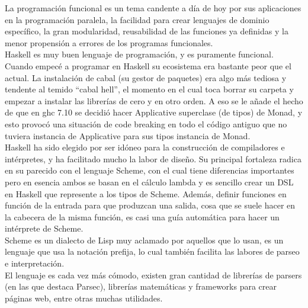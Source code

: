 

La programaci\'on funcional es un tema candente a d\'ia de hoy por sus aplicaciones en la programaci\'on paralela, la facilidad para crear lenguajes de dominio espec\'ifico, la gran modularidad, reusabilidad de las funciones ya definidas y la menor propensi\'on a errores de los programas funcionales.\\

Haskell es muy buen lenguaje de programaci\'on, y es puramente funcional. Cuando empec\'e a programar en Haskell su ecosistema era bastante peor que el actual. La instalaci\'on de cabal (su gestor de paquetes) era algo m\'as tediosa y tendente al temido ``cabal hell'', el momento en el cual toca borrar su carpeta y empezar a instalar las librer\'ias de cero y en otro orden. A eso se le a\~{n}ade el hecho de que en ghc 7.10 se decidi\'o hacer Applicative superclase (de tipos) de Monad, y esto provoc\'o una situaci\'on de code breaking en todo el c\'odigo antiguo que no tuviera instancia de Applicative para sus tipos instancia de Monad.\\

Haskell ha sido elegido por ser id\'oneo para la construcci\'on de compiladores e int\'erpretes, y ha facilitado mucho la labor de dise\~{n}o. Su principal fortaleza radica en su parecido con el lenguaje Scheme, con el cual tiene diferencias importantes pero en esencia ambos se basan en el c\'alculo lambda y es sencillo crear un DSL en Haskell que represente a los tipos de Scheme. Adem\'as, definir funciones en funci\'on de la entrada para que produzcan una salida, cosa que se suele hacer en la cabecera de la misma funci\'on, es casi una gu\'ia autom\'atica para hacer un int\'erprete de Scheme.\\

Scheme es un dialecto de Lisp muy aclamado por aquellos que lo usan, es un lenguaje que usa la notaci\'on prefija, lo cual tambi\'en facilita las labores de parseo e interpretaci\'on.\\

El lenguaje es cada vez m\'as c\'omodo, existen gran cantidad de librer\'ias de parsers (en las que destaca Parsec), librer\'ias matem\'aticas y frameworks para crear p\'aginas web, entre otras muchas utilidades.\\

